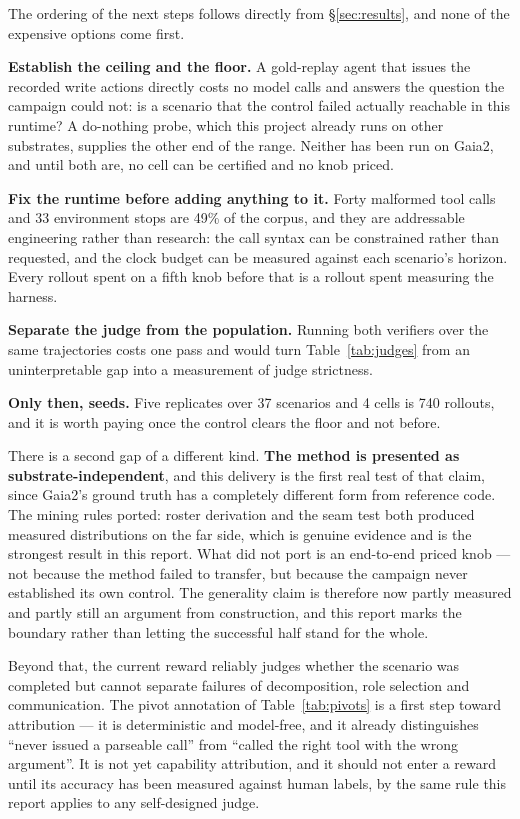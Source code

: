 \documentclass[11pt,a4paper]{article}
\begin{document}
The ordering of the next steps follows directly from \S\ref{sec:results}, and none of the expensive options come first.

\textbf{Establish the ceiling and the floor.} A gold-replay agent that issues the recorded write actions directly costs no model calls and answers the question the campaign could not: is a scenario that the control failed actually reachable in this runtime? A do-nothing probe, which this project already runs on other substrates, supplies the other end of the range. Neither has been run on Gaia2, and until both are, no cell can be certified and no knob priced.

\textbf{Fix the runtime before adding anything to it.} Forty malformed tool calls and 33 environment stops are 49\% of the corpus, and they are addressable engineering rather than research: the call syntax can be constrained rather than requested, and the clock budget can be measured against each scenario's horizon. Every rollout spent on a fifth knob before that is a rollout spent measuring the harness.

\textbf{Separate the judge from the population.} Running both verifiers over the same trajectories costs one pass and would turn Table~\ref{tab:judges} from an uninterpretable gap into a measurement of judge strictness.

\textbf{Only then, seeds.} Five replicates over 37 scenarios and 4 cells is 740 rollouts, and it is worth paying once the control clears the floor and not before.

There is a second gap of a different kind. \textbf{The method is presented as substrate-independent}, and this delivery is the first real test of that claim, since Gaia2's ground truth has a completely different form from reference code. The mining rules ported: roster derivation and the seam test both produced measured distributions on the far side, which is genuine evidence and is the strongest result in this report. What did not port is an end-to-end priced knob --- not because the method failed to transfer, but because the campaign never established its own control. The generality claim is therefore now partly measured and partly still an argument from construction, and this report marks the boundary rather than letting the successful half stand for the whole.

Beyond that, the current reward reliably judges whether the scenario was completed but cannot separate failures of decomposition, role selection and communication. The pivot annotation of Table~\ref{tab:pivots} is a first step toward attribution --- it is deterministic and model-free, and it already distinguishes ``never issued a parseable call'' from ``called the right tool with the wrong argument''. It is not yet capability attribution, and it should not enter a reward until its accuracy has been measured against human labels, by the same rule this report applies to any self-designed judge.
\end{document}
